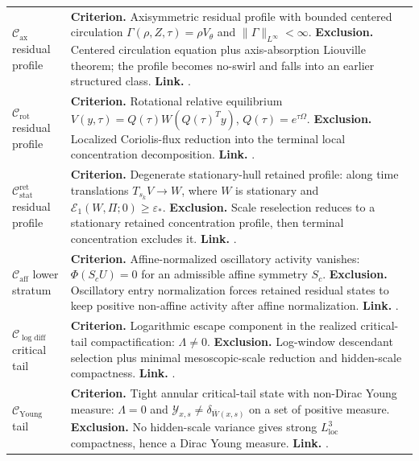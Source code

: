 \documentclass[11pt]{amsart}
\numberwithin{equation}{section}
\theoremstyle{plain}
\theoremstyle{definition}
\theoremstyle{remark}
\newcommand{\eps}{\varepsilon}
\newcommand{\loc}{\mathrm{loc}}
\newcommand{\calE}{\mathcal E}
\newcommand{\Cax}{\mathcal C_{\mathrm{ax}}}
\newcommand{\Crot}{\mathcal C_{\mathrm{rot}}}
\newcommand{\Cstat}{\mathcal C_{\mathrm{stat}}^{\mathrm{ret}}}
\newcommand{\Caff}{\mathcal C_{\mathrm{aff}}}
\newcommand{\Cyoung}{\mathcal C_{\mathrm{Young}}}
\newcommand{\Clogdiff}{\mathcal C_{\log\mathrm{diff}}}
\begin{document}
\begin{longtable}{@{}L{1.20in}L{4.65in}@{}}
\(\Cax\) residual profile &
\textbf{Criterion.}  Axisymmetric residual profile with bounded centered
circulation \(\Gamma(\rho,Z,\tau)=\rho V_\theta\) and
\(\|\Gamma\|_{L^\infty}<\infty\).
\textbf{Exclusion.}  Centered circulation equation plus axis-absorption
Liouville theorem; the profile becomes no-swirl and falls into an earlier
structured class.
\textbf{Link.}  .\\

\(\Crot\) residual profile &
\textbf{Criterion.}  Rotational relative equilibrium
\(V(y,\tau)=Q(\tau)W(Q(\tau)^Ty)\), \(Q(\tau)=e^{\tau\Omega}\).
\textbf{Exclusion.}  Localized Coriolis-flux reduction into the terminal local
concentration decomposition.
\textbf{Link.}  .\\

\(\Cstat\) residual profile &
\textbf{Criterion.}  Degenerate stationary-hull retained profile: along
time translations \(T_{s_k}V\to W\), where \(W\) is stationary and
\(\calE_1(W,\Pi;0)\ge\eps_*\).
\textbf{Exclusion.}  Scale reselection reduces to a stationary retained
concentration profile, then terminal concentration excludes it.
\textbf{Link.}  .\\

\(\Caff\) lower stratum &
\textbf{Criterion.}  Affine-normalized oscillatory activity vanishes:
\(\Phi(S_cU)=0\) for an admissible affine symmetry \(S_c\).
\textbf{Exclusion.}  Oscillatory entry normalization forces retained residual
states to keep positive non-affine activity after affine normalization.
\textbf{Link.}  .\\

\(\Clogdiff\) critical tail &
\textbf{Criterion.}  Logarithmic escape component in the realized
critical-tail compactification: \(\Lambda\ne0\).
\textbf{Exclusion.}  Log-window descendant selection plus minimal
mesoscopic-scale reduction and hidden-scale compactness.
\textbf{Link.}  .\\

\(\Cyoung\) tail &
\textbf{Criterion.}  Tight annular critical-tail state with non-Dirac Young
measure: \(\Lambda=0\) and
\(\mathcal Y_{x,s}\ne\delta_{\bar W(x,s)}\) on a set of positive measure.
\textbf{Exclusion.}  No hidden-scale variance gives strong
\(L^3_{\loc}\) compactness, hence a Dirac Young measure.
\textbf{Link.}  .\\


\end{longtable}
\end{document}
